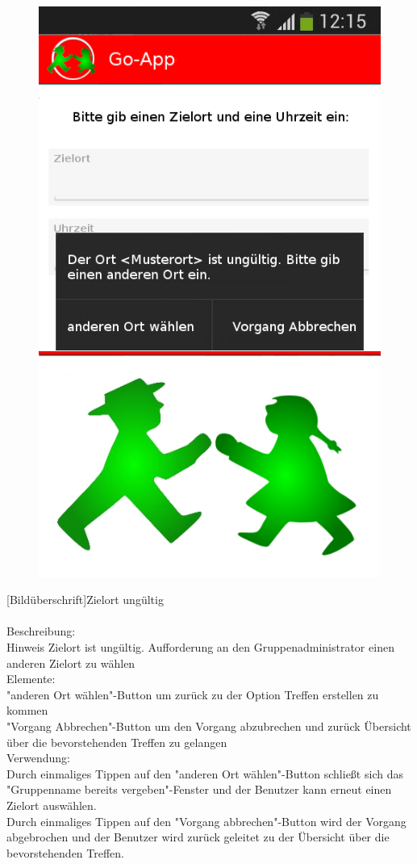 \begin{figure}
	\includegraphics[scale =1]{resources/images/treffpunkt_erstellen_ungueltig_Ort.png}
\end{figure}
[Bildüberschrift]Zielort ungültig\\ \\
[Kleinüberschrift]Beschreibung:\\
Hinweis Zielort ist ungültig. Aufforderung an den Gruppenadministrator einen anderen Zielort zu wählen\\
[Kleinüberschrift]Elemente:\\
"anderen Ort wählen"-Button um zurück zu der Option Treffen erstellen zu kommen\\
"Vorgang Abbrechen"-Button um den Vorgang abzubrechen und zurück Übersicht über die bevorstehenden Treffen zu gelangen\\
[Kleinüberschrift]Verwendung:\\
Durch einmaliges Tippen auf den "anderen Ort wählen"-Button schließt sich das "Gruppenname bereits vergeben"-Fenster und der Benutzer kann erneut einen Zielort auswählen.\\
Durch einmaliges Tippen auf den "Vorgang abbrechen"-Button wird der Vorgang abgebrochen und der Benutzer wird zurück geleitet zu der Übersicht über die bevorstehenden Treffen.\\ \\

